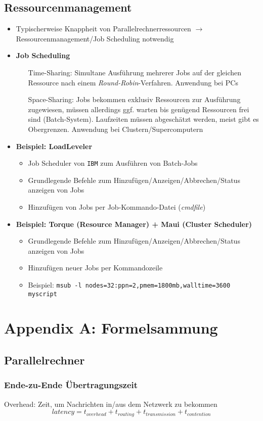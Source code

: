 \subsection{Ressourcenmanagement}
\begin{itemize}
	\item Typischerweise Knappheit von Parallelrechnerressourcen \(\rightarrow\) Ressourcenmanagement/Job Scheduling notwendig
	\item \textbf{Job Scheduling}
	\begin{enumerate}
		\item[Time-Sharing:] Simultane Ausführung mehrerer Jobs auf der gleichen Ressource nach einem \textit{Round-Robin}-Verfahren. Anwendung bei PCs
		\item[Space-Sharing:] Jobs bekommen exklusiv Ressourcen zur Ausführung zugewiesen, müssen allerdings ggf. warten bis genügend Ressourcen frei sind (Batch-System). Laufzeiten müssen abgeschätzt werden, meist gibt es Obergrenzen. Anwendung bei Clustern/Supercomputern
	\end{enumerate}
	\item \textbf{Beispiel: LoadLeveler}
	\begin{itemize}
		\item Job Scheduler von \texttt{IBM} zum Ausführen von Batch-Jobs
		\item Grundlegende Befehle zum Hinzufügen/Anzeigen/Abbrechen/Status anzeigen von Jobs
		\item Hinzufügen von Jobs per Job-Kommando-Datei (\textit{cmdfile})
	\end{itemize}
	\item \textbf{Beispiel: Torque (Resource Manager) + Maui (Cluster Scheduler)}
	\begin{itemize}
		\item Grundlegende Befehle zum Hinzufügen/Anzeigen/Abbrechen/Status anzeigen von Jobs
		\item Hinzufügen neuer Jobs per Kommandozeile
		\item Beispiel: \texttt{msub -l nodes=32:ppn=2,pmem=1800mb,walltime=3600 myscript}
	\end{itemize}
\end{itemize}



\section{Appendix A: Formelsammung}

\subsection{Parallelrechner}

\subsubsection{Ende-zu-Ende Übertragungszeit}
Overhead: Zeit, um Nachrichten in/aus dem Netzwerk zu bekommen
\begin{equation}
	latency = t_{overhead} + t_{routing} + t_{transmission} + t_{contention}
\end{equation}